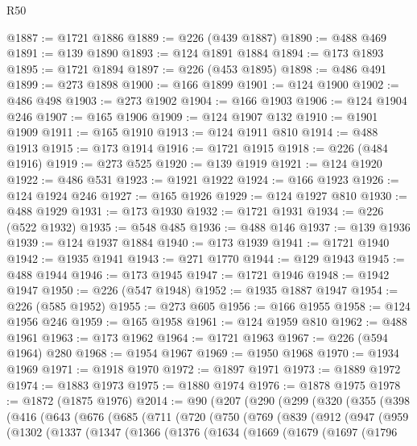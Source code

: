 \begin{lexlean}{R50}
\begin{coremodule}
@1887 := @1721 @1886
@1889 := @226 (@439 @1887)
@1890 := @488 @469
@1891 := @139 @1890
@1893 := @124 @1891 @1884
@1894 := @173 @1893
@1895 := @1721 @1894
@1897 := @226 (@453 @1895)
@1898 := @486 @491
@1899 := @273 @1898
@1900 := @166 @1899
@1901 := @124 @1900
@1902 := @486 @498
@1903 := @273 @1902
@1904 := @166 @1903
@1906 := @124 @1904 @246
@1907 := @165 @1906
@1909 := @124 @1907 @132
@1910 := @1901 @1909
@1911 := @165 @1910
@1913 := @124 @1911 @810
@1914 := @488 @1913
@1915 := @173 @1914
@1916 := @1721 @1915
@1918 := @226 (@484 @1916)
@1919 := @273 @525
@1920 := @139 @1919
@1921 := @124 @1920
@1922 := @486 @531
@1923 := @1921 @1922
@1924 := @166 @1923
@1926 := @124 @1924 @246
@1927 := @165 @1926
@1929 := @124 @1927 @810
@1930 := @488 @1929
@1931 := @173 @1930
@1932 := @1721 @1931
@1934 := @226 (@522 @1932)
@1935 := @548 @485
@1936 := @488 @146
@1937 := @139 @1936
@1939 := @124 @1937 @1884
@1940 := @173 @1939
@1941 := @1721 @1940
@1942 := @1935 @1941
@1943 := @271 @1770
@1944 := @129 @1943
@1945 := @488 @1944
@1946 := @173 @1945
@1947 := @1721 @1946
@1948 := @1942 @1947
@1950 := @226 (@547 @1948)
@1952 := @1935 @1887 @1947
@1954 := @226 (@585 @1952)
@1955 := @273 @605
@1956 := @166 @1955
@1958 := @124 @1956 @246
@1959 := @165 @1958
@1961 := @124 @1959 @810
@1962 := @488 @1961
@1963 := @173 @1962
@1964 := @1721 @1963
@1967 := @226 (@594 @1964) @280
@1968 := @1954 @1967
@1969 := @1950 @1968
@1970 := @1934 @1969
@1971 := @1918 @1970
@1972 := @1897 @1971
@1973 := @1889 @1972
@1974 := @1883 @1973
@1975 := @1880 @1974
@1976 := @1878 @1975
@1978 := @1872 (@1875 @1976)
@2014 := @90
    (@207
      (@290
        (@299
          (@320
            (@355
              (@398
                (@416
                  (@643
                    (@676
                      (@685
                        (@711
                          (@720
                            (@750
                              (@769
                                (@839
                                  (@912
                                    (@947
                                      (@959
                                        (@1302
                                          (@1337
                                            (@1347
                                              (@1366
                                                (@1376
                                                  (@1634
                                                    (@1669
                                                      (@1679
                                                        (@1697
                                                          (@1796

\end{coremodule}
\end{lexlean}

